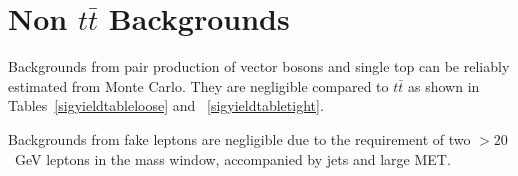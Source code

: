 \section{Non $t\bar{t}$ Backgrounds}
\label{sec:othBG}

Backgrounds from pair production of vector bosons and single top
can be reliably estimated from Monte Carlo.
They are negligible compared to $t\bar{t}$ as shown in Tables~\ref{sigyieldtableloose} and ~\ref{sigyieldtabletight}.

Backgrounds from fake leptons are negligible due to the requirement of two \pt$ > 20$~GeV leptons
in the \Z mass window, accompanied by jets and large MET.



